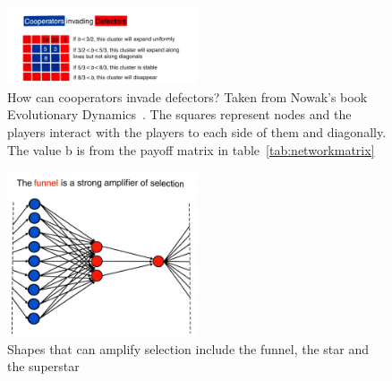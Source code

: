 \documentclass[]{final_report}
\begin{document}
\begin{figure}
	\center
	\includegraphics[width=0.5\textwidth]{cooperators-invading-defectors.jpg}
	\caption{How can cooperators invade defectors? Taken from Nowak's book Evolutionary Dynamics~\cite{nowak2006evolutionary}. The squares represent nodes and the players interact with the players to each side of them and diagonally. The value b is from the payoff matrix in table~\ref{tab:networkmatrix}}
	\label{fig:coopinvdef}
\end{figure}
\begin{figure}	\center
	\includegraphics[width=0.5\textwidth]{funnel_amplifier.jpg}
	\caption{Shapes that can amplify selection include the funnel, the star and the superstar~\cite{nowak2006evolutionary}}
	\label{fig:funnel}
\end{figure}
\end{document}
